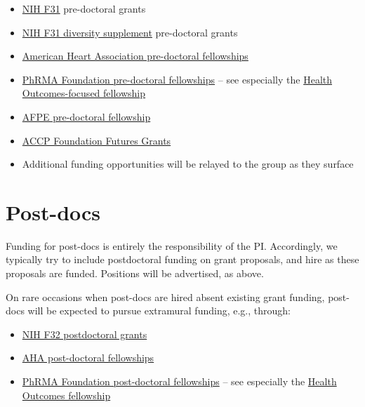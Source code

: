 \documentclass[
  letterpaper,
  DIV=11,
  numbers=noendperiod]{scrreprt}
\begin{document}
\begin{itemize}
\item
  \href{https://researchtraining.nih.gov/programs/fellowships/F31}{NIH
  F31} pre-doctoral grants
\item
  \href{https://researchtraining.nih.gov/programs/fellowships/F31-diversity}{NIH
  F31 diversity supplement} pre-doctoral grants
\item
  \href{https://professional.heart.org/en/research-programs/application-information/predoctoral-fellowship}{American
  Heart Association pre-doctoral fellowships}
\item
  \href{https://www.phrmafoundation.org/awards/pre-doctoral-fellowship-awards/}{PhRMA
  Foundation pre-doctoral fellowships} -- see especially the
  \href{https://www.phrmafoundation.org/awards/pre-doctoral-fellowship-awards/value-assessment-health-outcomes/}{Health
  Outcomes-focused fellowship}
\item
  \href{https://afpepharm.org/index.php/pre-doctoral-fellowships/}{AFPE
  pre-doctoral fellowship}
\item
  \href{https://www.accpfoundation.org/futures/}{ACCP Foundation Futures
  Grants}
\item
  Additional funding opportunities will be relayed to the group as they
  surface
\end{itemize}

\hypertarget{post-docs}{%
\section{Post-docs}\label{post-docs}}

Funding for post-docs is entirely the responsibility of the PI.
Accordingly, we typically try to include postdoctoral funding on grant
proposals, and hire as these proposals are funded. Positions will be
advertised, as above.

On rare occasions when post-docs are hired absent existing grant
funding, post-docs will be expected to pursue extramural funding, e.g.,
through:

\begin{itemize}
\item
  \href{https://researchtraining.nih.gov/programs/fellowships/F32}{NIH
  F32 postdoctoral grants}
\item
  \href{https://professional.heart.org/en/research-programs/application-information/postdoctoral-fellowship}{AHA
  post-doctoral fellowships}
\item
  \href{https://www.phrmafoundation.org/awards/post-doctoral-fellowships/}{PhRMA
  Foundation post-doctoral fellowships} -- see especially the
  \href{https://www.phrmafoundation.org/awards/post-doctoral-fellowships/value-assessment-health-outcomes/}{Health
  Outcomes fellowship}
\end{itemize}
\end{document}
